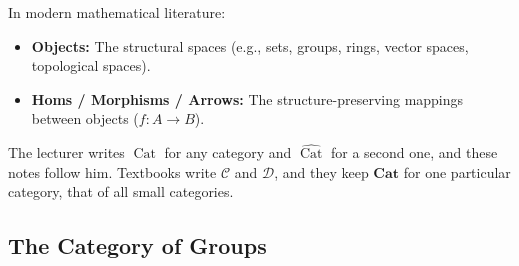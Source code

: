\begin{content}

\begin{steps}
In modern mathematical literature:
\begin{itemize}
    \item \textbf{Objects:} The structural spaces (e.g., sets, groups, rings, vector spaces, topological spaces).
    \item \textbf{Homs / Morphisms / Arrows:} The structure-preserving mappings between objects ($f \colon A \to B$).
\end{itemize}
\end{steps}
\end{content}

\begin{aiNote}
The lecturer writes $\operatorname{Cat}$ for any category and $\widehat{\operatorname{Cat}}$ for a second one, and these notes follow him. Textbooks write $\mathcal{C}$ and $\mathcal{D}$, and they keep $\mathbf{Cat}$ for one particular category, that of all small categories.
\end{aiNote}

\subsection{The Category of Groups}

